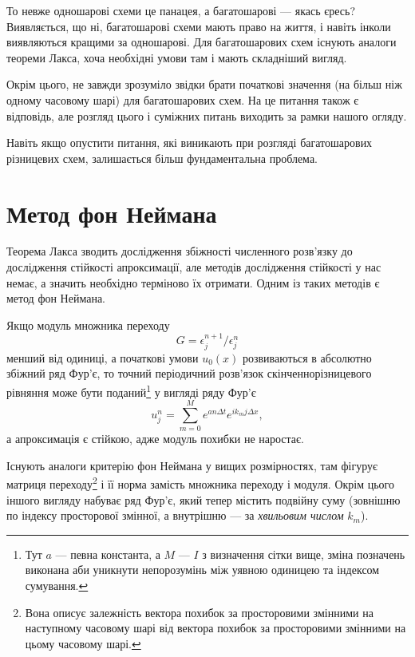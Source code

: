 То невже одношарові схеми це панацея, а багатошарові --- якась єресь? Виявляється, що ні, багатошарові схеми мають право на життя, і навіть інколи виявляються кращими за одношарові. Для багатошарових схем існують аналоги теореми Лакса, хоча необхідні умови там і мають складніший вигляд. \medskip

Окрім цього, не завжди зрозуміло звідки брати початкові значення (на більш ніж одному часовому шарі) для багатошарових схем. На це питання також є відповідь, але розгляд цього і суміжних питань виходить за рамки нашого огляду. \medskip

Навіть якщо опустити питання, які виникають при розгляді багатошарових різницевих схем, залишається більш фундаментальна проблема.

\section{Метод фон Неймана}

Теорема Лакса зводить дослідження збіжності численного розв'язку до дослідження стійкості апроксимації, але методів дослідження стійкості у нас немає, а значить необхідно терміново їх отримати. Одним із таких методів є метод фон Неймана. 

\begin{theorem}
    Якщо модуль множника переходу
    \begin{equation}
        G = \epsilon_j^{n + 1} / \epsilon_j^n
    \end{equation}
    менший від одиниці, а початкові умови $u_0(x)$ розвиваються в абсолютно збіжний ряд Фур'є, то точний періодичний розв'язок скінченнорізницевого рівняння може бути поданий\footnote{Тут $a$ --- певна константа, а $M$ --- $I$ з визначення сітки вище, зміна позначень виконана аби уникнути непорозумінь між уявною одиницею та індексом сумування.} у вигляді ряду Фур'є
    \begin{equation}
        u_j^n = \sum_{m = 0}^M e^{a n \Delta t} e^{i k_m j \Delta x},
    \end{equation}
    а апроксимація є стійкою, адже модуль похибки не наростає.
\end{theorem}

Існують аналоги критерію фон Неймана у вищих розмірностях, там фігурує матриця переходу\footnote{Вона описує залежність вектора похибок за просторовими змінними на наступному часовому шарі від вектора похибок за просторовими змінними на цьому часовому шарі.} і її норма замість множника переходу і модуля. Окрім цього іншого вигляду набуває ряд Фур'є, який тепер містить подвійну суму (зовнішню по індексу просторової змінної, а внутрішню --- за \textit{хвильовим числом} $k_m$). \medskip

